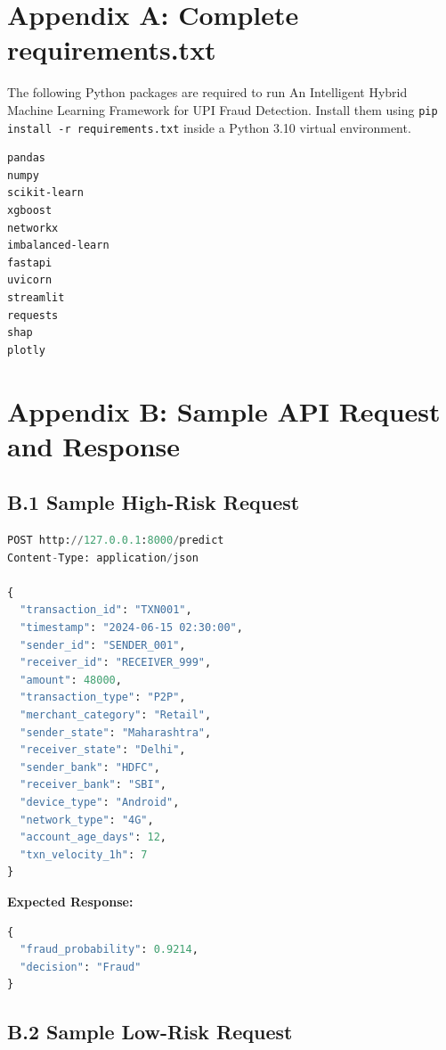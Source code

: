 \chapter*{Appendix A: Complete requirements.txt}

The following Python packages are required to run An Intelligent Hybrid Machine Learning Framework for UPI Fraud Detection. Install them using \texttt{pip install -r requirements.txt} inside a Python 3.10 virtual environment.

\begin{lstlisting}[language=bash, caption={requirements.txt -- Python dependencies}]
pandas
numpy
scikit-learn
xgboost
networkx
imbalanced-learn
fastapi
uvicorn
streamlit
requests
shap
plotly
\end{lstlisting}

\chapter*{Appendix B: Sample API Request and Response}

\section*{B.1 Sample High-Risk Request}

\begin{lstlisting}[language=Python, caption={High-risk transaction API call}]
POST http://127.0.0.1:8000/predict
Content-Type: application/json

{
  "transaction_id": "TXN001",
  "timestamp": "2024-06-15 02:30:00",
  "sender_id": "SENDER_001",
  "receiver_id": "RECEIVER_999",
  "amount": 48000,
  "transaction_type": "P2P",
  "merchant_category": "Retail",
  "sender_state": "Maharashtra",
  "receiver_state": "Delhi",
  "sender_bank": "HDFC",
  "receiver_bank": "SBI",
  "device_type": "Android",
  "network_type": "4G",
  "account_age_days": 12,
  "txn_velocity_1h": 7
}
\end{lstlisting}

\textbf{Expected Response:}

\begin{lstlisting}[language=Python, caption={API response for high-risk transaction}]
{
  "fraud_probability": 0.9214,
  "decision": "Fraud"
}
\end{lstlisting}

\section*{B.2 Sample Low-Risk Request}

